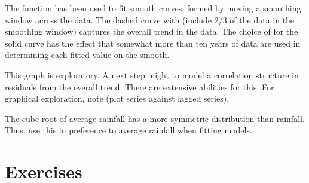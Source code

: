 The  function has been used to fit smooth curves,
formed by moving a smoothing window across the data.
The dashed curve with  (include 2/3 of the data in the
smoothing window) captures the overall trend in the data.
The choice of  for the solid curve has the effect that
somewhat more than ten years of data are used in determining each
fitted value on the smooth.

This graph is exploratory.  A next step might to model a
correlation structure in residuals from the overall trend.  There
are extensive abilities for this.  For graphical exploration, note
 (plot series against lagged series).

The cube root of average rainfall has a more symmetric distribution
than rainfall.  Thus, use this in preference to average rainfall when
fitting models.


\section{Exercises}


